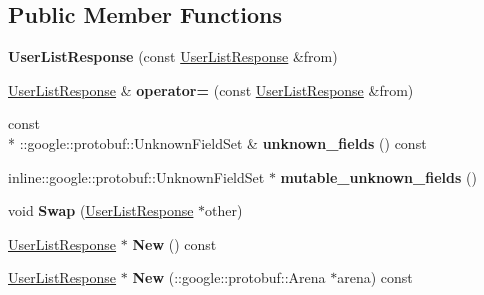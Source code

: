 \subsection*{Public Member Functions}
\begin{DoxyCompactItemize}
\item 
\hypertarget{classSimpleChat_1_1UserListResponse_a16b237391d6a195da652a12d0a3dd81d}{{\bfseries User\-List\-Response} (const \hyperlink{classSimpleChat_1_1UserListResponse}{User\-List\-Response} \&from)}\label{classSimpleChat_1_1UserListResponse_a16b237391d6a195da652a12d0a3dd81d}

\item 
\hypertarget{classSimpleChat_1_1UserListResponse_a777dbe9b9136d3c4e661fd4dd4f977cd}{\hyperlink{classSimpleChat_1_1UserListResponse}{User\-List\-Response} \& {\bfseries operator=} (const \hyperlink{classSimpleChat_1_1UserListResponse}{User\-List\-Response} \&from)}\label{classSimpleChat_1_1UserListResponse_a777dbe9b9136d3c4e661fd4dd4f977cd}

\item 
\hypertarget{classSimpleChat_1_1UserListResponse_ab4b494abc5d4878a87c8103f0ad44728}{const \\*
\-::google\-::protobuf\-::\-Unknown\-Field\-Set \& {\bfseries unknown\-\_\-fields} () const }\label{classSimpleChat_1_1UserListResponse_ab4b494abc5d4878a87c8103f0ad44728}

\item 
\hypertarget{classSimpleChat_1_1UserListResponse_a506a12daf50705b94c187981afa036e6}{inline\-::google\-::protobuf\-::\-Unknown\-Field\-Set $\ast$ {\bfseries mutable\-\_\-unknown\-\_\-fields} ()}\label{classSimpleChat_1_1UserListResponse_a506a12daf50705b94c187981afa036e6}

\item 
\hypertarget{classSimpleChat_1_1UserListResponse_a68d71246e15fdb6e36bb3d3858d512ed}{void {\bfseries Swap} (\hyperlink{classSimpleChat_1_1UserListResponse}{User\-List\-Response} $\ast$other)}\label{classSimpleChat_1_1UserListResponse_a68d71246e15fdb6e36bb3d3858d512ed}

\item 
\hypertarget{classSimpleChat_1_1UserListResponse_a8369b7418d0b9f0ce0bbff3805fe5e8f}{\hyperlink{classSimpleChat_1_1UserListResponse}{User\-List\-Response} $\ast$ {\bfseries New} () const }\label{classSimpleChat_1_1UserListResponse_a8369b7418d0b9f0ce0bbff3805fe5e8f}

\item 
\hypertarget{classSimpleChat_1_1UserListResponse_a25678c10520af6c57f02e689298f7555}{\hyperlink{classSimpleChat_1_1UserListResponse}{User\-List\-Response} $\ast$ {\bfseries New} (\-::google\-::protobuf\-::\-Arena $\ast$arena) const }\label{classSimpleChat_1_1UserListResponse_a25678c10520af6c57f02e689298f7555}


\end{DoxyCompactItemize}

